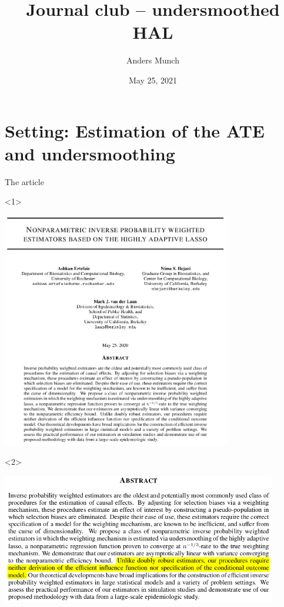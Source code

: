 \documentclass[smaller]{beamer}\usepackage{listings}
\author{Anders Munch}
\date{May 25, 2021}
\title{Journal club -- undersmoothed HAL}
\begin{document}
\maketitle
\section{Setting: Estimation of the ATE and undersmoothing}
\label{sec:org94aa56c}

\begin{frame}[label={sec:org26a78c4}]{The article}
\begin{onlyenv}<1>
\begin{center}
\includegraphics[width=0.75\textwidth]{./screenshots/abstract.png}
\end{center}
\end{onlyenv}

\begin{onlyenv}<2>
\begin{center}
\includegraphics[width=0.9\textwidth]{./screenshots/abstract2.png}
\end{center}
\end{onlyenv}
\end{frame}
\end{document}

